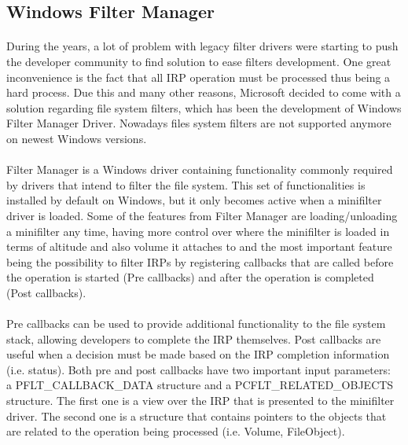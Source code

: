 	   
		\subsection{Windows Filter Manager}
		\paragraph{}
		During the years, a lot of problem with legacy filter drivers were starting to push the developer community to find solution to ease filters development. One great inconvenience is the fact that all IRP operation must be processed thus being a hard process. Due this and many other reasons, Microsoft decided to come with a solution regarding file system filters, which has been the development of Windows Filter Manager Driver. Nowadays files system filters are not supported anymore on newest Windows versions.
		
		\paragraph{}
		Filter Manager is a Windows driver containing functionality commonly required by drivers that intend to filter the file system. This set of functionalities is installed by default on Windows, but it only becomes active when a minifilter driver is loaded. \cite{MSDNFltMgrConcepts} Some of the features from Filter Manager are loading/unloading a minifilter any time, having more control over where the minifilter is loaded in terms of altitude and also volume it attaches to and the most important feature being the possibility to filter IRPs by registering callbacks that are called before the operation is started (Pre callbacks) and after the operation is completed (Post callbacks). 
		
		\paragraph{}	
		Pre callbacks can be used to provide additional functionality to the file system stack, allowing developers to complete the IRP themselves. Post callbacks are useful when a decision must be made based on the IRP completion information (i.e. status). Both pre and post callbacks have two important input parameters: \\ a PFLT\_CALLBACK\_DATA structure and a PCFLT\_RELATED\_OBJECTS structure. The first one is a view over the IRP that is presented to the minifilter driver. The second one is a structure that contains pointers to the objects that are related to the operation being processed (i.e. Volume, FileObject).
		
